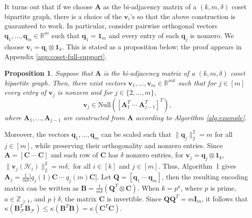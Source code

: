 \documentclass[journal,draftcls,onecolumn]{IEEEtran}
\theoremstyle{mystyle}
\newtheorem{prop}{Proposition}
\newcommand{\bfA}{\mathbf{A}}
\begin{document}
It turns out that if we choose $\mathbf{A}$ as the bi-adjacency matrix of a $(k,m,\delta)$ coset bipartite graph, there is a choice of the $\mathbf{v}_i$'s so that the above construction is guaranteed to work. In particular, consider pairwise orthogonal vectors $\mathbf{q}_1, \dots, \mathbf{q}_m \in \mathbb{R}^{m}$ such that $\mathbf{q}_1 = \mathbf{1}_m$ and every entry of each $\mathbf{q}_j$ is nonzero. We choose $\mathbf{v}_i = \mathbf{q}_i \otimes \mathbf{1}_k$. This is stated as a proposition below; the proof appears in Appendix \ref{app:coset-full-support}. 
\begin{prop}
\label{prop:coset-full-support}
Suppose that $\mathbf{A}$ is the bi-adjacency matrix of a $(k,m,\delta)$ coset bipartite graph. Then, there exist vectors $\mathbf{v}_1,\ldots,\mathbf{v}_m\in\mathbb{R}^{mk}$ such that for $j \in [m]$ every entry of $\mathbf{v}_j$ is nonzero  and for $j \in \{ 2, \dots, m\}$,
\[
\mathbf{v}_j \in
\text{Null}\left(
\left[
\mathbf{A}_1^{T}\ \cdots\ \mathbf{A}_{j-1}^{T}
\right]^{T}
\right),\] 
where $\mathbf{A}_1,\ldots,\mathbf{A}_{j-1}$ are constructed from $\bfA$ according to Algorithm \ref{alg:example}.
\end{prop}


Moreover, the vectors $\mathbf{q}_1,\ldots,\mathbf{q}_m$ can be scaled such that
$\|\mathbf{q}_j\|_2^2=m$ for all $j\in[m]$, while preserving their orthogonality
and nonzero entries. Since $\mathbf{A}=[\mathbf{C}\ \cdots\ \mathbf{C}]$ and each
row of $\mathbf{C}$ has $\delta$ nonzero entries, for
$\mathbf{v}_j=\mathbf{q}_j\otimes\mathbf{1}_k$,
$
\|\mathbf{v}_j(\mathcal{H}_i)\|_2^2=m\delta,
$
for all $i\in[k]$ and $j\in[m]$. Thus, Algorithm~1 gives
$
\mathbf{A}_j=\frac{1}{m\delta}
\big[q_j(1)\mathbf{C}\ \cdots\ q_j(m)\mathbf{C}\big].
$
Let $\mathbf{Q}=[\mathbf{q}_1\ \cdots\ \mathbf{q}_m]$, then the resulting encoding
matrix can be written as
$
\mathbf{B}=\frac{1}{m\delta}\left(\mathbf{Q}^T\otimes\mathbf{C}\right).
$
When $k=p^a$, where $p$ is prime, $a\in\mathbb{Z}_{\geq 1}$, and
$p\nmid\delta$, the matrix $\mathbf{C}$ is invertible. Since
$\mathbf{Q}\mathbf{Q}^T=m\mathbf{I}_m$, it follows that
$
\kappa(\mathbf{B}_{\mathcal{F}}^T\mathbf{B}_{\mathcal{F}})
\leq
\kappa(\mathbf{B}^T\mathbf{B})
=
\kappa(\mathbf{C}^T\mathbf{C}).
$
\end{document}
